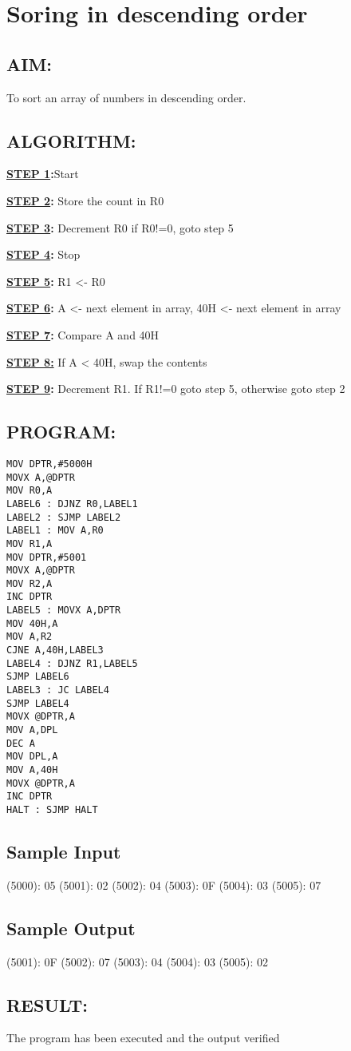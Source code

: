\chapter{ Soring in descending order}
%
%
%
%
\section*{AIM:}
To sort an array of numbers in descending order.

\section*{ALGORITHM:}
\textbf{\underline{STEP 1}:}Start

\textbf{\underline{STEP 2}:} Store the count in R0

\textbf{\underline{STEP 3}:} Decrement R0 if R0!=0, goto step 5

\textbf{\underline{STEP 4}:} Stop

\textbf{\underline{STEP 5}:} R1 <- R0 

\textbf{\underline{STEP 6}:} A <- next element in array, 40H <- next element in array

\textbf{\underline{STEP 7}:} Compare A and 40H

\textbf{\underline{STEP 8:}} If A < 40H, swap the contents

\textbf{\underline{STEP 9}:} Decrement R1. If R1!=0 goto step 5, otherwise goto step 2


\section*{PROGRAM:}

\begin{lstlisting}
MOV DPTR,#5000H
MOVX A,@DPTR
MOV R0,A 
LABEL6 : DJNZ R0,LABEL1
LABEL2 : SJMP LABEL2
LABEL1 : MOV A,R0
MOV R1,A
MOV DPTR,#5001
MOVX A,@DPTR
MOV R2,A
INC DPTR
LABEL5 : MOVX A,DPTR
MOV 40H,A
MOV A,R2
CJNE A,40H,LABEL3
LABEL4 : DJNZ R1,LABEL5
SJMP LABEL6
LABEL3 : JC LABEL4
SJMP LABEL4
MOVX @DPTR,A
MOV A,DPL
DEC A
MOV DPL,A
MOV A,40H
MOVX @DPTR,A
INC DPTR
HALT : SJMP HALT 
\end{lstlisting}

\section*{Sample Input}
(5000): 05
(5001): 02
(5002): 04
(5003): 0F
(5004): 03
(5005): 07

\section*{Sample Output}
(5001): 0F
(5002): 07 
(5003): 04
(5004): 03
(5005): 02

\section*{RESULT:}
The program has been executed and the output verified
%
%
%
%
